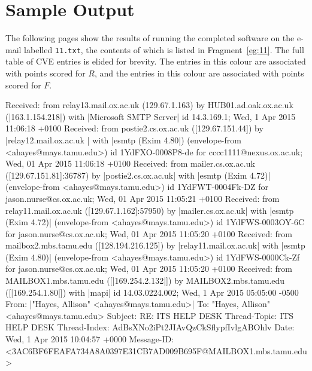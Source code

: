 \section{Sample Output}

The following pages show the results of running the completed software on the
e-mail labelled \texttt{11.txt}, the contents of which is listed in
Fragment~\ref{eg:11}.  The full table of CVE entries is elided for brevity.  
The entries in \colorbox{red!30}{this colour} are associated with points scored
for $R$, and the entries in \colorbox{blue!30}{this colour} are associated with
points scored for $F$.

\begin{example}[caption=Email \texttt{11.txt},label=eg:11]
Received: from relay13.mail.ox.ac.uk (129.67.1.163) by HUB01.ad.oak.ox.ac.uk 
 (|\colorbox{red!30}{163.1.154.218}|) with |\colorbox{red!30}{Microsoft SMTP Server}| id 14.3.169.1; Wed, 1 Apr 2015 
 11:06:18 +0100 
Received: from postie2.cs.ox.ac.uk ([129.67.151.44])	by |\colorbox{red!30}{relay12.mail.ox.ac.uk }|
 with |\colorbox{red!30}{esmtp (Exim 4.80}|)	(envelope-from <ahayes@mays.tamu.edu>)	id 
 1YdFXO-0008P8-de	for cccc1111@nexus.ox.ac.uk; Wed, 01 Apr 2015 11:06:18 +0100 
Received: from mailer.cs.ox.ac.uk ([129.67.151.81]:36787)	by 
 |\colorbox{red!30}{postie2.cs.ox.ac.uk}| with |\colorbox{red!30}{esmtp (Exim 4.72)}|	(envelope-from 
 <ahayes@mays.tamu.edu>)	id 1YdFWT-0004Fk-DZ	for jason.nurse@cs.ox.ac.uk; Wed, 
 01 Apr 2015 11:05:21 +0100 
Received: from relay11.mail.ox.ac.uk ([129.67.1.162]:57950)	by 
|\colorbox{red!30}{mailer.cs.ox.ac.uk}| with |\colorbox{red!30}{esmtp (Exim 4.72)}|	(envelope-from 
 <ahayes@mays.tamu.edu>)	id 1YdFWS-0003OY-6C	for jason.nurse@cs.ox.ac.uk; Wed, 
 01 Apr 2015 11:05:20 +0100 
Received: from mailbox2.mbs.tamu.edu ([128.194.216.125])	by 
|\colorbox{red!30}{relay11.mail.ox.ac.uk}| with |\colorbox{red!30}{esmtp (Exim 4.80)}|	(envelope-from 
 <ahayes@mays.tamu.edu>)	id 1YdFWS-0000Ck-Zf	for jason.nurse@cs.ox.ac.uk; Wed, 
 01 Apr 2015 11:05:20 +0100 
Received: from MAILBOX1.mbs.tamu.edu ([|\colorbox{red!30}{169.254.2.132}|]) by
MAILBOX2.mbs.tamu.edu ([|\colorbox{red!30}{169.254.1.80}|]) with |\colorbox{red!30}{mapi}| id 14.03.0224.002; Wed, 1
Apr 2015 05:05:00 -0500
From: |\colorbox{blue!30}{"Hayes, Allison" <ahayes@mays.tamu.edu>}|
To: "Hayes, Allison" <ahayes@mays.tamu.edu>
Subject: RE: ITS HELP DESK
Thread-Topic: ITS HELP DESK
Thread-Index: AdBsXNo2iPt2JIAvQzCkSflypfIvlgABOhlv
Date: Wed, 1 Apr 2015 10:04:57 +0000 
Message-ID: <3AC6BF6FEAFA734A8A0397E31CB7AD009B695F@MAILBOX1.mbs.tamu.edu> 

\end{example}

